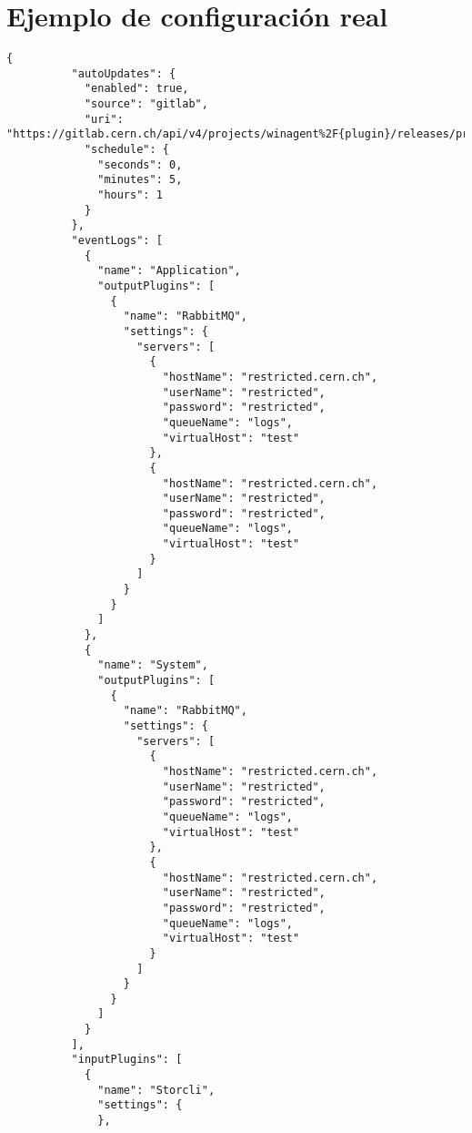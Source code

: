     
\chapter{Ejemplo de configuración real}\label{anx:settings}
    \begin{lstlisting}[style=csharp, caption=Fichero de configuración]
        {
          "autoUpdates": {
            "enabled": true,
            "source": "gitlab",
            "uri": "https://gitlab.cern.ch/api/v4/projects/winagent%2F{plugin}/releases/production",
            "schedule": {
              "seconds": 0,
              "minutes": 5,
              "hours": 1
            }
          },
          "eventLogs": [
            {
              "name": "Application",
              "outputPlugins": [
                {
                  "name": "RabbitMQ",
                  "settings": {
                    "servers": [
                      {
                        "hostName": "restricted.cern.ch",
                        "userName": "restricted",
                        "password": "restricted",
                        "queueName": "logs",
                        "virtualHost": "test"
                      },
                      {
                        "hostName": "restricted.cern.ch",
                        "userName": "restricted",
                        "password": "restricted",
                        "queueName": "logs",
                        "virtualHost": "test"
                      }
                    ]
                  }
                }
              ]
            },
            {
              "name": "System",
              "outputPlugins": [
                {
                  "name": "RabbitMQ",
                  "settings": {
                    "servers": [
                      {
                        "hostName": "restricted.cern.ch",
                        "userName": "restricted",
                        "password": "restricted",
                        "queueName": "logs",
                        "virtualHost": "test"
                      },
                      {
                        "hostName": "restricted.cern.ch",
                        "userName": "restricted",
                        "password": "restricted",
                        "queueName": "logs",
                        "virtualHost": "test"
                      }
                    ]
                  }
                }
              ]
            }
          ],
          "inputPlugins": [
            {
              "name": "Storcli",
              "settings": {
              },

\end{lstlisting}
